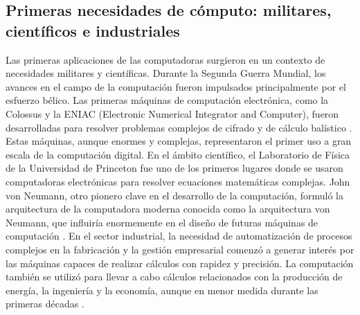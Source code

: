 \documentclass[]{article}
\begin{document}
\subsection{Primeras necesidades de cómputo: militares, científicos e industriales}
Las primeras aplicaciones de las computadoras surgieron en un contexto de necesidades militares y científicas. Durante la Segunda Guerra Mundial, los avances en el campo de la computación fueron impulsados principalmente por el esfuerzo bélico. Las primeras máquinas de computación electrónica, como la Colossus y la ENIAC (Electronic Numerical Integrator and Computer), fueron desarrolladas para resolver problemas complejos de cifrado y de cálculo balístico \cite{bowen1993}. Estas máquinas, aunque enormes y complejas, representaron el primer uso a gran escala de la computación digital.
En el ámbito científico, el Laboratorio de Física de la Universidad de Princeton fue uno de los primeros lugares donde se usaron computadoras electrónicas para resolver ecuaciones matemáticas complejas. John von Neumann, otro pionero clave en el desarrollo de la computación, formuló la arquitectura de la computadora moderna conocida como la arquitectura von Neumann, que influiría enormemente en el diseño de futuras máquinas de computación \cite{vonneumann1945}.
En el sector industrial, la necesidad de automatización de procesos complejos en la fabricación y la gestión empresarial comenzó a generar interés por las máquinas capaces de realizar cálculos con rapidez y precisión. La computación también se utilizó para llevar a cabo cálculos relacionados con la producción de energía, la ingeniería y la economía, aunque en menor medida durante las primeras décadas \cite{ceruzzi2003}.
\end{document}
